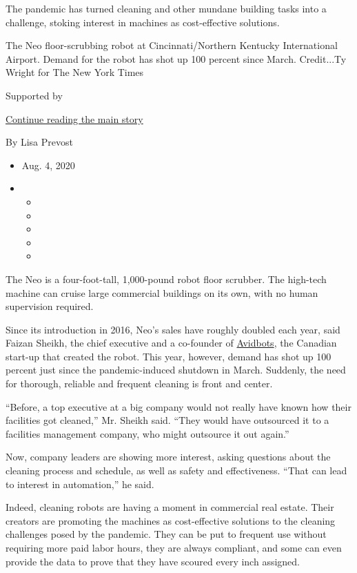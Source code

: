 The pandemic has turned cleaning and other mundane building tasks into a
challenge, stoking interest in machines as cost-effective solutions.

The Neo floor-scrubbing robot at Cincinnati/Northern Kentucky
International Airport. Demand for the robot has shot up 100 percent
since March. Credit...Ty Wright for The New York Times

Supported by

\protect\hyperlink{after-sponsor}{Continue reading the main story}

By Lisa Prevost

\begin{itemize}
\item
  Aug. 4, 2020
\item
  \begin{itemize}
  \item
  \item
  \item
  \item
  \item
  \end{itemize}
\end{itemize}

The Neo is a four-foot-tall, 1,000-pound robot floor scrubber. The
high-tech machine can cruise large commercial buildings on its own, with
no human supervision required.

Since its introduction in 2016, Neo's sales have roughly doubled each
year, said Faizan Sheikh, the chief executive and a co-founder of
\href{https://www.avidbots.com/}{Avidbots}, the Canadian start-up that
created the robot. This year, however, demand has shot up 100 percent
just since the pandemic-induced shutdown in March. Suddenly, the need
for thorough, reliable and frequent cleaning is front and center.

``Before, a top executive at a big company would not really have known
how their facilities got cleaned,'' Mr. Sheikh said. ``They would have
outsourced it to a facilities management company, who might outsource it
out again.''

Now, company leaders are showing more interest, asking questions about
the cleaning process and schedule, as well as safety and effectiveness.
``That can lead to interest in automation,'' he said.

Indeed, cleaning robots are having a moment in commercial real estate.
Their creators are promoting the machines as cost-effective solutions to
the cleaning challenges posed by the pandemic. They can be put to
frequent use without requiring more paid labor hours, they are always
compliant, and some can even provide the data to prove that they have
scoured every inch assigned.

